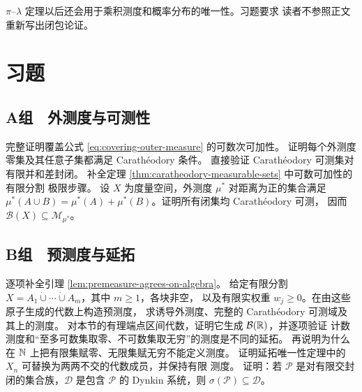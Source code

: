 $\pi$--$\lambda$ 定理以后还会用于乘积测度和概率分布的唯一性。习题要求
读者不参照正文重新写出闭包论证。

\section*{习题}

\subsection*{A组　外测度与可测性}
\begin{enumerate}[label=\textbf{\thechapter.\arabic*.}]
 完整证明覆盖公式 \eqref{eq:covering-outer-measure} 的可数次可加性。
 证明每个外测度零集及其任意子集都满足 Carathéodory 条件。
 直接验证 Carathéodory 可测集对有限并和差封闭。
 补全定理 \ref{thm:caratheodory-measurable-sets} 中可数可加性的有限分割
 极限步骤。
 设 $X$ 为度量空间，外测度 $\mu^*$ 对距离为正的集合满足
 $\mu^*(A\cup B)=\mu^*(A)+\mu^*(B)$。证明所有闭集均 Carathéodory 可测，
 因而 $\mathcal B(X)\subseteq\mathcal M_{\mu^*}$。
\end{enumerate}

\subsection*{B组　预测度与延拓}
\begin{enumerate}[label=\textbf{\thechapter.\arabic*.},resume]
 逐项补全引理 \ref{lem:premeasure-agrees-on-algebra}。
 给定有限分割 $X=A_1\dot\cup\cdots\dot\cup A_m$，其中 $m\ge1$，各块非空，
 以及有限实权重 $w_j\ge0$。在由这些原子生成的代数上构造预测度，
 求诱导外测度、完整的 Carathéodory 可测域及其上的测度。
 对本节的有理端点区间代数，证明它生成 $\mathcal B(\mathbb{R})$，并逐项验证
 计数测度和“至多可数集取零、不可数集取无穷”的测度是不同的延拓。
 再说明为什么在 $\mathbb{N}$ 上把有限集赋零、无限集赋无穷不能定义测度。
 证明延拓唯一性定理中的 $X_n$ 可替换为两两不交的代数成员，并保持有限
 测度。
 证明：若 $\mathcal P$ 是对有限交封闭的集合族，$\mathcal D$ 是包含
 $\mathcal P$ 的 Dynkin 系统，则 $\sigma(\mathcal P)\subseteq\mathcal D$。
\end{enumerate}

